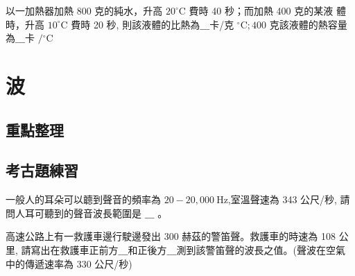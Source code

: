 \documentclass[cn,10pt,math=newtx,chinesefont=founder]{../elegantbook}
\begin{document}
\begin{example}
    以一加熱器加熱 800 克的純水，升高 $20^{\circ} \mathrm{C}$ 費時 40 秒；而加熱 400 克的某液 體時，升高 $10^{\circ} \mathrm{C}$ 費時 20 秒, 則該液體的比熱為$\_\_\_$卡/克 ${ }^{\circ} \mathrm{C} ; 400$ 克該液體的熱容量為$\_\_\_$卡 $/{ }^{\circ} \mathrm{C}$
\end{example}
\begin{solution}
    
\end{solution}
\newpage
\section{波}
\subsection{重點整理}
\newpage
\subsection{考古題練習}
\begin{example}
    一般人的耳朵可以聼到聲音的頻率為 $20-20,000 \mathrm{~Hz}$,室溫聲速為 343 公尺/秒, 請問人耳可聽到的聲音波長範圍是 $\_\_\_$ 。
\end{example}
\begin{solution}

\end{solution}
\vspace{6cm}
\begin{example}
    高速公路上有一救護車邊行駛邊發出 300 赫茲的警笛聲。救護車的時速為 108 公里, 請寫出在救護車正前方$\_\_\_$和正後方$\_\_\_$測到該警笛聲的波長之值。(聲波在空氣中的傳遞速率為 330 公尺/秒)
\end{example}
\begin{solution}
    
\end{solution}
\vspace{6cm}
\end{document}
